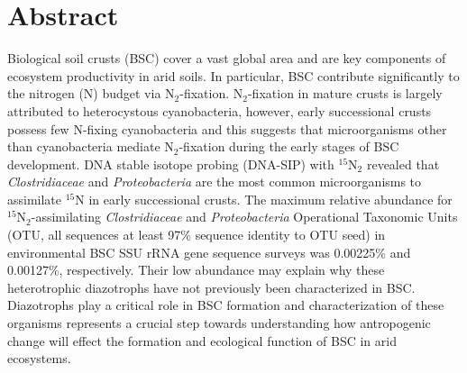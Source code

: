 \section{Abstract}
Biological soil crusts (BSC) cover a vast global area and are key components of
ecosystem productivity in arid soils. In particular, BSC contribute
significantly to the nitrogen (N) budget via N$_{2}$-fixation.
N$_{2}$-fixation in mature crusts is largely attributed to heterocystous
cyanobacteria, however, early successional crusts possess few N-fixing
cyanobacteria and this suggests that microorganisms other than cyanobacteria
mediate N$_{2}$-fixation during the early stages of BSC development. DNA stable
isotope probing (DNA-SIP) with $^{15}$N$_{2}$ revealed that
\textit{Clostridiaceae} and \textit{Proteobacteria} are the most common
microorganisms to assimilate $^{15}$N in early successional crusts.  The
maximum relative abundance for $^{15}$N$_{2}$-assimilating
\textit{Clostridiaceae} and \textit{Proteobacteria} Operational Taxonomic Units
(OTU, all sequences at least 97\% sequence identity to OTU seed) in
environmental BSC SSU rRNA gene sequence surveys was 0.00225\% and 0.00127\%,
respectively. Their low abundance may explain why these heterotrophic
diazotrophs have not previously been characterized in BSC.  Diazotrophs play a
critical role in BSC formation and characterization of these organisms
represents a crucial step towards understanding how antropogenic change will
effect the formation and ecological function of BSC in arid ecosystems.


